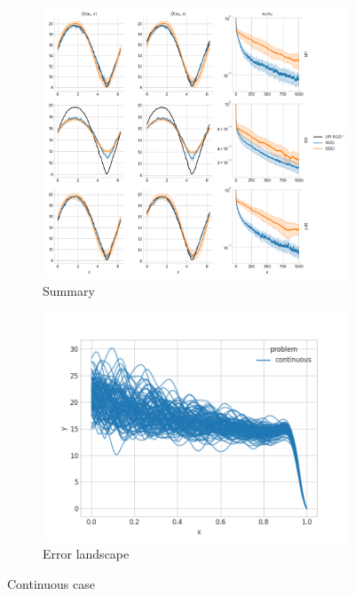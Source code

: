 \documentclass[11pt]{article}
\begin{document}
\begin{figure}[h!]
    \centering
    \begin{subfigure}{.9\textwidth}
      \centering
      \includegraphics[width=\linewidth]{../figs/Q_ctrl_SGD_vs_CBO_summary_continuous_resnet.png}
      \caption{Summary}
      \label{fig:summary_cont}
    \end{subfigure}
    \begin{subfigure}{.5\textwidth}
      \centering
      \includegraphics[width=\linewidth]{../figs/Q_ctrl_landscape_plot_continuous_resnet.png}
      \caption{Error landscape}
      \label{fig:error_landscape_cont}
    \end{subfigure}
    \caption{Continuous case}
    \label{fig:cont}
\end{figure}
\end{document}
